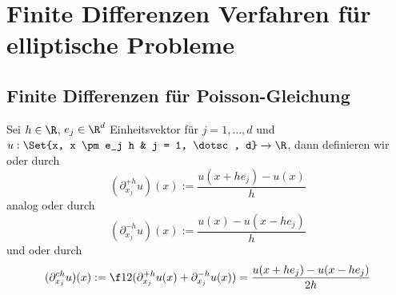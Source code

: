 \chapter{Finite Differenzen Verfahren für elliptische Probleme} \label{chap:2}



\section{Finite Differenzen für Poisson-Gleichung} \label{sec:2.1}


\begin{df} \label{2.1}
	Sei $h \in \R$, $e_j \in \R^d$ Einheitsvektor für $j = 1, \dotsc, d$ und $u: \Set{x, x \pm e_j h & j = 1, \dotsc, d} \to \R$, dann definieren wir  oder  durch
	\[
		(\partial_{x_j}^{+h}u)(x) := \frac{u(x+he_j) -u(x)}{h}
	\]
	analog  oder  durch
	\[
		(\partial_{x_j}^{-h}u)(x) := \frac{u(x) - u(x-he_j)}{h}
	\]
	und  oder  durch
	\[
		(\partial_{x_j}^{ch} u)(x)
		:= \f 12 (\partial_{x_j}^{+h} u(x) + \partial_{x_j}^{-h} u(x))
		= \frac{u(x+he_j) - u(x-he_j)}{2h}
	\]
\end{df}


